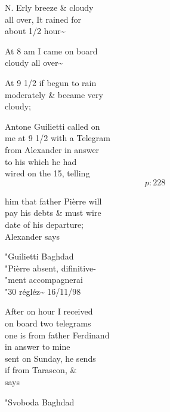 \documentclass{report}
\begin{document}
	\par{
 	N. Erly breeze \& cloudy\ \\all over, It rained for\ \\about 1/2 hour\~{}\ \\
	}

	\par{
 	At 8 am I came on board\ \\cloudy all over\~{}\ \\
	}

	\par{
 	At 9 1/2 if begun to rain\ \\moderately \& became very\ \\cloudy;\ \\
	}

	\par{
 	Antone Guilietti called on\ \\me at 9 1/2 with a Telegram\ \\from Alexander in answer\ \\to his which he had\ \\wired on the 15, telling\ \\
  \[p: 228 \]

	}

	\par{
 	him that father Pièrre will\ \\pay his debts \& must wire\ \\date of his departure;\ \\Alexander says\ \\
	}

	\par{
 	"Guilietti Baghdad\ \\"Pièrre absent, difinitive-\ \\"ment accompagnerai\ \\"30 régléz\~{} 16/11/98\ \\
	}

	\par{
 	After on hour I received\ \\on board two telegrams\ \\one is from father Ferdinand\ \\in answer to mine\ \\sent on Sunday, he sends\ \\if from Tarascon, \&\ \\says\ \\
	}

	\par{
 	"Svoboda Baghdad\ \\
	}
\end{document}

